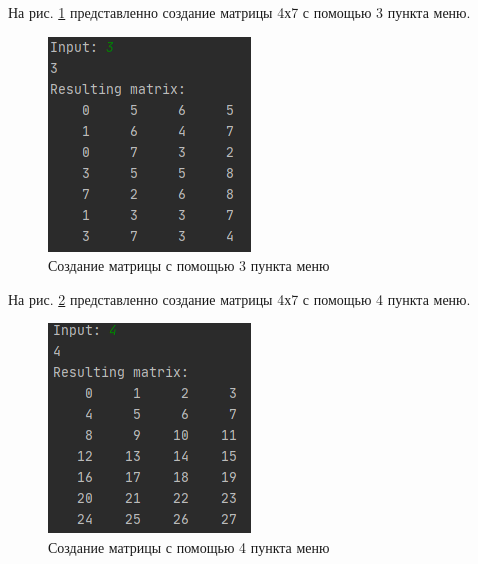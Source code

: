 \newpage

На рис. \ref{matrix_creation3} представленно создание матрицы 4х7 с помощью 3 пункта меню.

\begin{figure}[hpt!]
	\centering
	\includegraphics[width=0.6\linewidth]{photo/matrix_creation3}
	\caption{Создание матрицы с помощью 3 пункта меню}
	\label{matrix_creation3}
\end{figure}

\newpage

На рис. \ref{matrix_creation4} представленно создание матрицы 4х7 с помощью 4 пункта меню.

\begin{figure}[hpt!]
	\centering
	\includegraphics[width=0.6\linewidth]{photo/matrix_creation4}
	\caption{Создание матрицы с помощью 4 пункта меню}
	\label{matrix_creation4}
\end{figure}

\newpage

